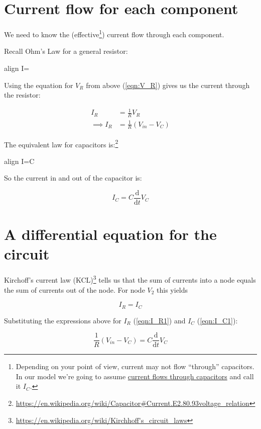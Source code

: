 \documentclass{article}
\newcommand{\boxedeq}[2]{\begin{empheq}[box={\fboxsep=6pt\fbox}]{align}\label{#1}#2\end{empheq}}
\begin{document}
\section{Current flow for each component}

We need to know the (effective\footnote{Depending on your point of view, current may not flow ``through''
	capacitors. In our model we're going to assume
	\href{https://www.youtube.com/watch?v=ppWBwZS4e7A}{current flows
		through capacitors} and call it $I_C$.}) current flow through each component.

Recall Ohm's Law for a general resistor:

\boxedeq{}{
	I=
}

Using the equation for $V_R$ from above (\ref{eqn:V_R}) gives us the current through the resistor:

\begin{align}
I_R &= \frac{1}{R}V_R\\
\label{eqn:I_R1}
\implies I_R &= \frac{1}{R}(V_{in} - V_C)
\end{align}

The equivalent law for capacitors is:\footnote{\url{https://en.wikipedia.org/wiki/Capacitor#Current.E2.80.93voltage_relation}}

\boxedeq{}{
	I=C
}

So the current in and out of the capacitor is:

\begin{equation}
\label{eqn:I_C1}
I_C = C\frac{\mathrm{d}}{\mathrm{d}t}V_C
\end{equation}


\section{A differential equation for the circuit \label{sec:diff-eqn}}

Kirchoff's current law (KCL)\footnote{\url{https://en.wikipedia.org/wiki/Kirchhoff's_circuit_laws}}
tells us that the sum of currents into a node
equals the sum of currents out of the node. For node $V_2$ this yields

\begin{equation}
I_R = I_C
\end{equation}

Substituting the expressions above for $I_R$ (\ref{eqn:I_R1}) and $I_C$ (\ref{eqn:I_C1}):

\begin{equation}
\frac{1}{R}(V_{in} - V_C) = C\frac{\mathrm{d}}{\mathrm{d}t}V_C
\label{eqn:nodal-equation}
\end{equation}
\end{document}
